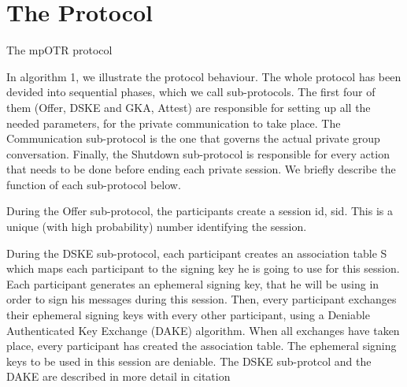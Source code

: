 \documentclass[]{article}
\begin{document}

\section{The Protocol}
\begin{algorithm}[h]
	\caption{The mpOTR protocol}
	\label{mpotr_algo}
\end{algorithm}

In algorithm 1, we illustrate the protocol behaviour.
The whole protocol has been devided into sequential phases, which we call sub-protocols.
The first four of them (Offer, DSKE and GKA, Attest) are responsible for setting up all the needed parameters, for the private communication to take place.
The Communication sub-protocol is the one that governs the actual private group conversation.
Finally, the Shutdown sub-protocol is responsible for every action that needs to be done before ending each private session.
We briefly describe the function of each sub-protocol below.

During the Offer sub-protocol, the participants create a session id, sid.
This is a unique (with high probability) number identifying the session.

During the DSKE sub-protocol, each participant creates an association table S which maps each participant to the signing key he is going to use for this session.
Each participant generates an ephemeral signing key, that he will be using in order to sign his messages during this session.
Then, every participant exchanges their ephemeral signing keys with every other participant, using a Deniable Authenticated Key Exchange (DAKE) algorithm.
When all exchanges have taken place, every participant has created the association table.
The ephemeral signing keys to be used in this session are deniable.
The DSKE sub-protcol and the DAKE are described in more detail in {citation}
\end{document}
